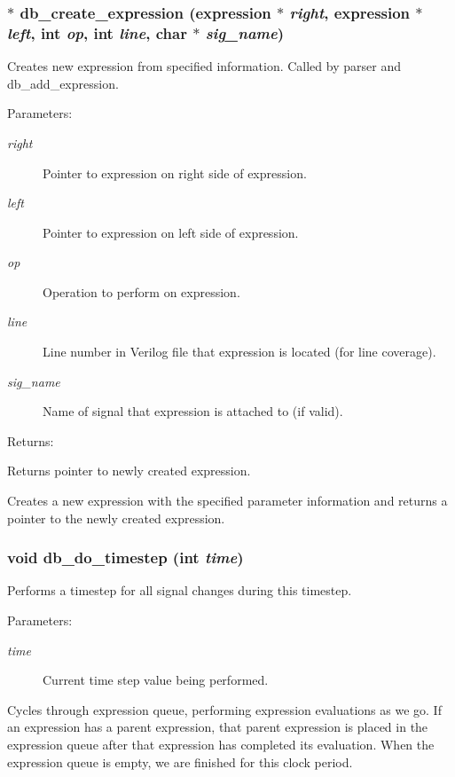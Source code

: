 \subsubsection{$\ast$ db\_\-create\_\-expression ({\bf expression} $\ast$ {\em right}, {\bf expression} $\ast$ {\em left}, int {\em op}, int {\em line}, char $\ast$ {\em sig\_\-name})}\label{db_8h_a6}


Creates new expression from specified information. Called by parser and db\_\-add\_\-expression.

\begin{Desc}
\item[Parameters: ]\par
\begin{description}
\item[{\em 
right}]Pointer to expression on right side of expression. \item[{\em 
left}]Pointer to expression on left side of expression. \item[{\em 
op}]Operation to perform on expression. \item[{\em 
line}]Line number in Verilog file that expression is located (for line coverage). \item[{\em 
sig\_\-name}]Name of signal that expression is attached to (if valid).\end{description}
\end{Desc}
\begin{Desc}
\item[Returns: ]\par
Returns pointer to newly created expression.\end{Desc}
Creates a new expression with the specified parameter information and returns a pointer to the newly created expression. 
\subsubsection{\setlength{\rightskip}{0pt plus 5cm}void db\_\-do\_\-timestep (int {\em time})}\label{db_8h_a13}


Performs a timestep for all signal changes during this timestep.

\begin{Desc}
\item[Parameters: ]\par
\begin{description}
\item[{\em 
time}]Current time step value being performed.\end{description}
\end{Desc}
Cycles through expression queue, performing expression evaluations as we go. If an expression has a parent expression, that parent expression is placed in the expression queue after that expression has completed its evaluation. When the expression queue is empty, we are finished for this clock period. 
